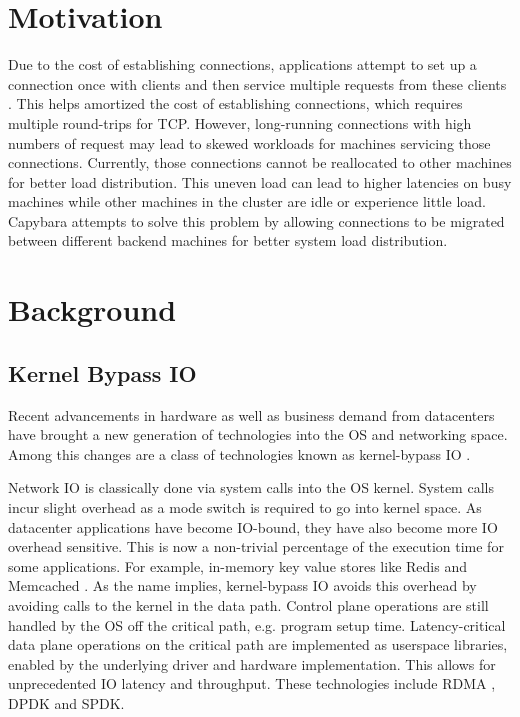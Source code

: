 
\section{Motivation}

Due to the cost of establishing connections, applications attempt to set up a connection once with clients and then service multiple requests from these clients \cite{prism}. This helps amortized the cost of establishing connections, which requires multiple round-trips for TCP. However, long-running connections with high numbers of request may lead to skewed workloads for machines servicing those connections. Currently, those connections cannot be reallocated to other machines for better load distribution. This uneven load can lead to higher latencies on busy machines while other machines in the cluster are idle or experience little load. Capybara attempts to solve this problem by allowing connections to be migrated between different backend machines for better system load distribution.

\section{Background}
\subsection{Kernel Bypass IO}
Recent advancements in hardware as well as business demand from datacenters have brought a new generation of technologies into the OS and networking space. Among this changes are a class of technologies known as kernel-bypass IO \cite{kernel-bypass-io}.

Network IO is classically done via system calls into the OS kernel. System calls incur slight overhead as a mode switch is required to go into kernel space. As datacenter applications have become IO-bound, they have also become more IO overhead sensitive. This is now a non-trivial percentage of the execution time for some applications. For example, in-memory key value stores like Redis \cite{redis} and Memcached \cite{memcached}. As the name implies, kernel-bypass IO avoids this overhead by avoiding calls to the kernel in the data path. Control plane operations are still handled by the OS off the critical path, e.g. program setup time. Latency-critical data plane operations on the critical path are implemented as userspace libraries, enabled by the underlying driver and hardware implementation. This allows for unprecedented IO latency and throughput. These technologies include RDMA \cite{rdma}, DPDK \cite{dpdk} and SPDK.

